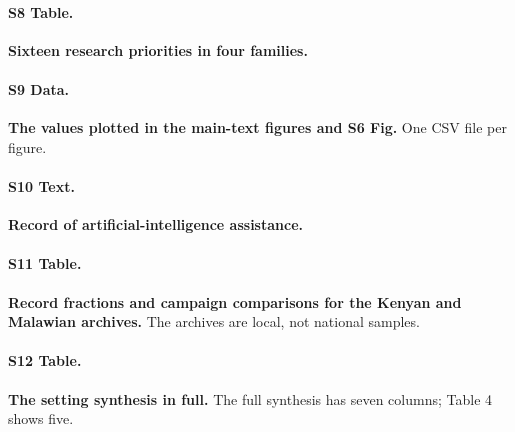 \documentclass[10pt,letterpaper]{article}
\begin{document}
\paragraph*{S8 Table.}
\label{S8_Table}
\textbf{Sixteen research priorities in four families.}

\paragraph*{S9 Data.}
\label{S9_Data}
\textbf{The values plotted in the main-text figures and S6 Fig.} One CSV file per figure.

\paragraph*{S10 Text.}
\label{S10_Text}
\textbf{Record of artificial-intelligence assistance.}

\paragraph*{S11 Table.}
\label{S11_Table}
\textbf{Record fractions and campaign comparisons for the Kenyan and Malawian archives.} The archives are local, not national samples.

\paragraph*{S12 Table.}
\label{S12_Table}
\textbf{The setting synthesis in full.} The full synthesis has seven columns; Table 4 shows five.
\end{document}
